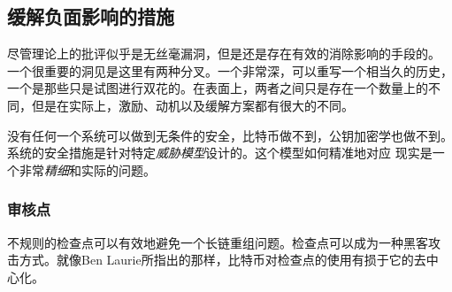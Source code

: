 \documentclass[letterpaper]{article}
\begin{document}
\subsection{缓解负面影响的措施}

尽管理论上的批评似乎是无丝毫漏洞，但是还是存在有效的消除影响的手段的。
一个很重要的洞见是这里有两种分叉。一个非常深，可以重写一个相当久的历史，
一个是那些只是试图进行双花的。在表面上，两者之间只是存在一个数量上的不
同，但是在实际上，激励、动机以及缓解方案都有很大的不同。

没有任何一个系统可以做到无条件的安全，比特币做不到，公钥加密学也做不到。
系统的安全措施是针对特定\emph{威胁模型}设计的。这个模型如何精准地对应
现实是一个非常\emph{精细}和实际的问题。

\subsubsection{审核点}
不规则的检查点可以有效地避免一个长链重组问题。检查点可以成为一种黑客攻
击方式。就像Ben Laurie所指出的那样，比特币对检查点的使用有损于它的去中
心化\cite{distrib_impossible}。
\end{document}
